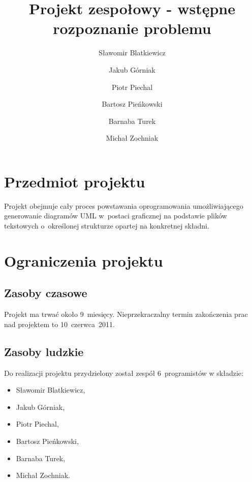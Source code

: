 \documentclass[a4paper, 11pt]{report}
\begin{document}
\author{
  Sławomir Blatkiewicz\and
  Jakub Górniak       \and
  Piotr Piechal       \and
  Bartosz Pieńkowski  \and
  Barnaba Turek       \and
  Michał Zochniak
}

\title{Projekt zespołowy - wstępne rozpoznanie problemu}


\maketitle %

\tableofcontents

\section{Przedmiot projektu}
Projekt obejmuje cały proces powstawania oprogramowania umożliwiającego generowanie diagramów UML 
w~postaci graficznej na podstawie plików tekstowych o~określonej strukturze opartej na konkretnej
składni.

\section{Ograniczenia projektu}

\subsection{Zasoby czasowe}
Projekt ma trwać około 9~miesięcy. Nieprzekraczalny termin zakończenia prac nad projektem to
10~czerwca~2011.

\subsection{Zasoby ludzkie}
Do realizacji projektu przydzielony został zespół 6~programistów w składzie:
  \begin{itemize}
    \item{Sławomir Blatkiewicz,}
    \item{Jakub Górniak,}
    \item{Piotr Piechal,}
    \item{Bartosz Pieńkowski,}
    \item{Barnaba Turek,}
    \item{Michał Zochniak.}
  \end{itemize}
\end{document}
